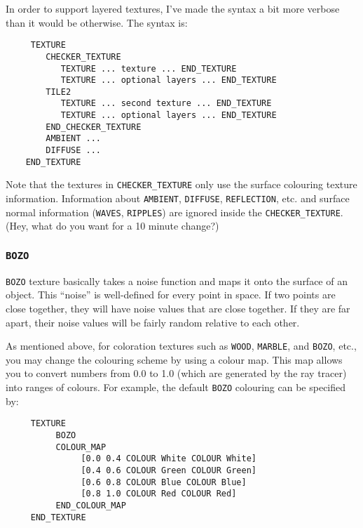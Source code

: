 In order to support layered textures, I've made the syntax a bit more verbose
than it would be otherwise.  The syntax is:
\begin{verbatim}
     TEXTURE
        CHECKER_TEXTURE
           TEXTURE ... texture ... END_TEXTURE
           TEXTURE ... optional layers ... END_TEXTURE
        TILE2
           TEXTURE ... second texture ... END_TEXTURE
           TEXTURE ... optional layers ... END_TEXTURE
        END_CHECKER_TEXTURE
        AMBIENT ...
        DIFFUSE ...
    END_TEXTURE
\end{verbatim}
Note that the textures in {\tt CHECKER_TEXTURE} only use the surface
colouring texture information.  Information about {\tt AMBIENT},
{\tt DIFFUSE}, {\tt REFLECTION}, etc.  and surface normal information
({\tt WAVES}, {\tt RIPPLES}) are ignored inside the {\tt CHECKER_TEXTURE}.
(Hey, what do you want for a 10 minute change?)

\subsubsection{{\tt BOZO}}

{\tt BOZO} texture basically takes a noise function and maps it onto
the surface of an object.  This ``noise'' is well-defined for every
point in space.  If two points are close together, they will have
noise values that are close together.  If they are far apart, their
noise values will be fairly random relative to each other.

As mentioned above, for coloration textures such as {\tt WOOD},
{\tt MARBLE}, and {\tt BOZO}, etc., you may change the colouring scheme by
using a colour map.
This map allows you to convert numbers from 0.0
to 1.0 (which are generated by the ray tracer) into ranges of colours.
For example, the default {\tt BOZO} colouring can be specified by:
\begin{verbatim}
     TEXTURE
          BOZO
          COLOUR_MAP
               [0.0 0.4 COLOUR White COLOUR White]
               [0.4 0.6 COLOUR Green COLOUR Green]
               [0.6 0.8 COLOUR Blue COLOUR Blue]
               [0.8 1.0 COLOUR Red COLOUR Red]
          END_COLOUR_MAP
     END_TEXTURE
\end{verbatim}

